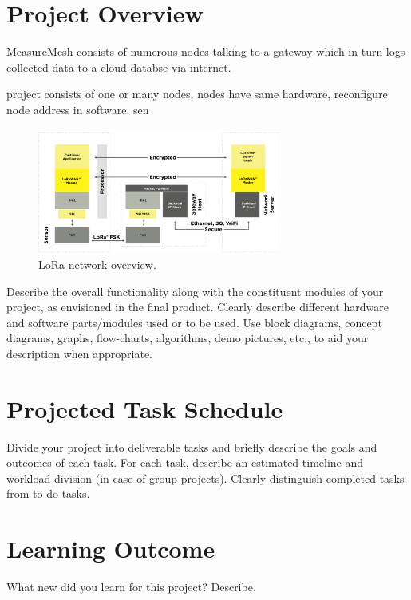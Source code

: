 \documentclass{IEEEtran}
\begin{document}
\section{Project Overview} 

MeasureMesh consists of numerous nodes talking to a gateway which in turn logs collected data to a cloud databse via internet.

project consists of one or many nodes, nodes have same hardware, reconfigure node address in software. sen

\begin{figure}[h!]
    \centering
    \includegraphics[width=8cm]{images/lorasystem}
    \caption{LoRa network overview.}
    \label{fig:lora_overview}
\end{figure}


Describe the overall functionality along with the constituent modules of your project, as envisioned in the final product. Clearly describe different hardware and software parts/modules used or to be used. Use block diagrams, concept diagrams, graphs, flow-charts, algorithms, demo pictures, etc., to aid your description when appropriate.

\section{Projected Task Schedule} 
Divide your project into deliverable tasks and briefly describe the goals and outcomes of each task. For each task, describe an estimated timeline and workload division (in case of group projects). Clearly distinguish completed tasks from to-do tasks.

\section{Learning Outcome}

What new did you learn for this project? Describe.





\end{document}
